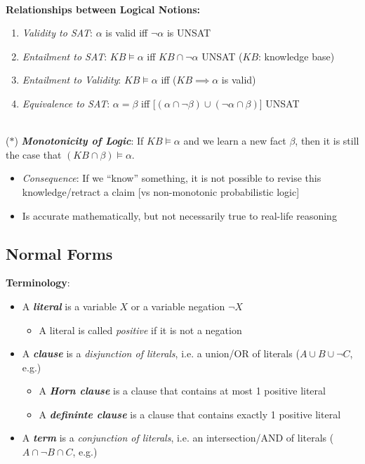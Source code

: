 \documentclass[12pt]{extarticle}
\theoremstyle{definition}
\theoremstyle{remark}
\newcommand{\pstart}[0]{\noindent}
\newcommand{\newp}[0]{~\\ \pstart}
\newcommand{\term}[1]{\noindent\textbf{\textit{#1}}}
\begin{document}
\newp
\textbf{Relationships between Logical Notions:} \begin{enumerate}
    \item \textit{Validity to SAT}: $\alpha$ is valid iff $\neg\alpha$ is UNSAT 
    \item \textit{Entailment to SAT}: $KB\models\alpha$ iff $KB\cap\neg\alpha$ UNSAT ($KB$: knowledge base)
    \item \textit{Entailment to Validity}: $KB\models\alpha$ iff ($KB\implies\alpha$ is valid)
    \item \textit{Equivalence to SAT}: $\alpha=\beta$ iff [$(\alpha\cap\neg\beta)\cup(\neg\alpha\cap\beta)$] UNSAT
\end{enumerate}

\newp
($\ast$) \term{Monotonicity of Logic}: If $KB\models\alpha$ and we learn a new fact $\beta$, then it is still the case that $(KB\cap\beta)\models\alpha$. \begin{itemize}
    \item \textit{Consequence}: If we ``know'' something, it is not possible to revise this knowledge/retract a claim  [vs non-monotonic probabilistic logic]
    \item Is accurate mathematically, but not necessarily true to real-life reasoning
\end{itemize}

\subsection{Normal Forms}
\textbf{Terminology}: \begin{itemize}
    \item A \term{literal} is a variable $X$ or a variable negation $\neg X$ \begin{itemize}
        \item A literal is called \textit{positive} if it is not a negation
    \end{itemize}
    \item A \term{clause} is a \textit{disjunction of literals}, i.e. a union/OR of literals ($A\cup B\cup \neg C$, e.g.) \begin{itemize}
        \item A \term{Horn clause} is a clause that contains at most 1 positive literal
        \item A \term{defininte clause} is a clause that contains exactly 1 positive literal
    \end{itemize}
    \item A \term{term} is a \textit{conjunction of literals}, i.e. an intersection/AND of literals ($A\cap \neg B\cap C$, e.g.)
\end{itemize}
\end{document}
